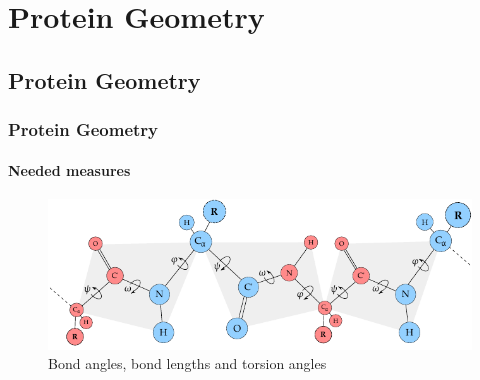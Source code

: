 \documentclass{beamer}
\begin{document}
\section{Protein Geometry}
\subsection{Protein Geometry}
\begin{frame}[t, fragile]
  \frametitle{Protein Geometry}
  \framesubtitle{Needed measures}
  
  \vspace{0.5cm}

  \begin{figure}
    \centering
    \includegraphics[width=\textwidth]{../rapport/figures/protein-torsion-angles.pdf}
    \caption{Bond angles, bond lengths and torsion angles}
    \label{fig:front}
  \end{figure}

\end{frame}
\end{document}
